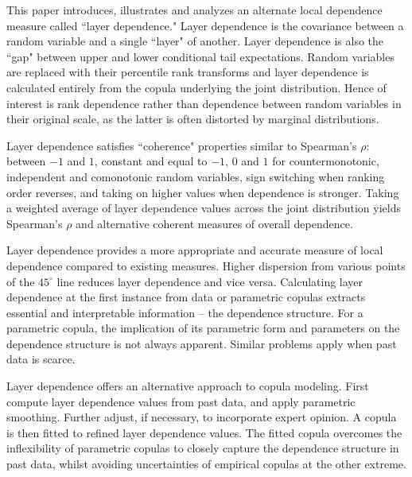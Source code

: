 \documentclass[authoryear]{elsarticle}
\begin{document}
This paper introduces, illustrates and analyzes an alternate local dependence measure called  ``layer dependence." Layer dependence is the covariance between a random variable and a single ``layer" of another. Layer dependence is also the ``gap" between upper and lower conditional tail expectations. Random variables are replaced with their percentile rank transforms and layer dependence is calculated entirely from the copula underlying the joint distribution. Hence of interest is rank dependence rather than dependence between random variables in their original scale, as the latter is often distorted by marginal distributions.


Layer dependence satisfies ``coherence" properties similar to Spearman's $\rho$: between $-1$ and $1$, constant and equal to $-1$, $0$ and $1$ for countermonotonic, independent and comonotonic random variables, sign switching when ranking order reverses, and taking on higher values when dependence is stronger. Taking a weighted average of layer dependence values across the joint distribution yields Spearman's $\rho$ and alternative coherent measures of overall dependence.


Layer dependence provides a more appropriate and accurate measure of local dependence compared to existing measures. Higher dispersion from various points of the $45^\circ$ line reduces layer dependence and vice versa. Calculating layer dependence at the first instance from data or parametric copulas extracts essential and interpretable information -- the dependence structure. For a parametric copula, the implication of its parametric form and parameters on the dependence structure is not always apparent. Similar problems apply when past data is scarce.


Layer dependence offers an alternative approach to copula modeling. First compute layer dependence values from past data, and apply parametric smoothing. Further adjust, if necessary, to incorporate expert opinion. A copula is then fitted to refined layer dependence values. The fitted copula overcomes the inflexibility of parametric copulas to closely capture the dependence structure in past data, whilst avoiding uncertainties of empirical copulas at the other extreme.
\end{document}
